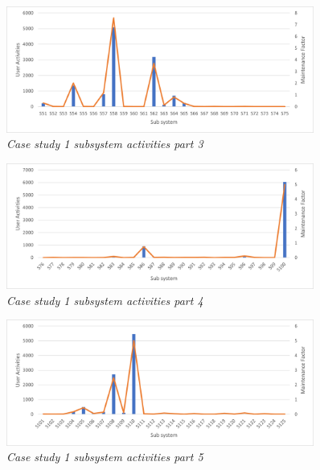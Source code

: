 \begin{figure}[!htb]
	\centering %
	\includegraphics[width=0.9\textwidth]{img/ch3/uat/systemA/s51_s75.png}
	\caption[Case study 1 subsystem activities part 3]
	{\textit{Case study 1 subsystem activities part 3}}\label{fig:ch3_saS51S75}
\end{figure} 

\begin{figure}[!htb]
	\centering %
	\includegraphics[width=0.9\textwidth]{img/ch3/uat/systemA/s76_s100.png}
	\caption[Case study 1 subsystem activities part 4]
	{\textit{Case study 1 subsystem activities part 4}}\label{fig:ch3_saS76S100}
\end{figure} 

\begin{figure}[!htb]
	\centering %
	\includegraphics[width=0.9\textwidth]{img/ch3/uat/systemA/s101_s125.png}
	\caption[Case study 1 subsystem activities part 5]
	{\textit{Case study 1 subsystem activities part 5}}\label{fig:ch3_saS101S125}
\end{figure} 

